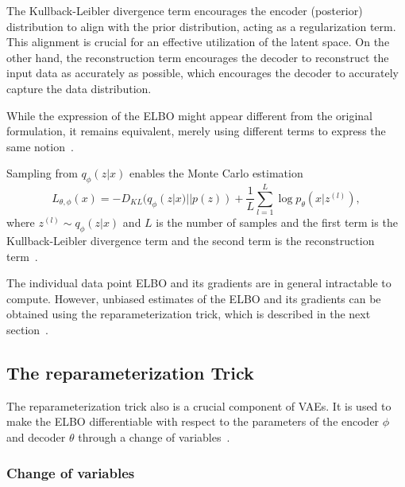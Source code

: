 The Kullback-Leibler divergence term encourages the encoder (posterior) distribution to align with the prior distribution, acting as a regularization term. This alignment is crucial for an effective utilization of the latent space. On the other hand, the reconstruction term encourages the decoder to reconstruct the input data as accurately as possible, which encourages the decoder to accurately capture the data distribution.

While the expression of the ELBO might appear different from the original formulation, it remains equivalent, merely using different terms to express the same notion~\cite{Kingma_2019}.


Sampling from $q_{\phi}(z|x)$ enables the Monte Carlo estimation
\[ L_{\theta, \phi}(x) = - D_{KL}(q_{\phi}(z|x) || p(z)) + \frac{1}{L} \sum_{l=1}^{L} \log p_{\theta}(x|z^{(l)}) ,\]
where $z^{(l)} \sim q_{\phi}(z|x)$ and $L$ is the number of samples and the first term is the Kullback-Leibler divergence term and the second term is the reconstruction term~\cite{Kingma_2019}. 


The individual data point ELBO and its gradients are in general intractable to compute. However, unbiased estimates of the ELBO and its gradients can be obtained using the reparameterization trick, which is described in the next section~\cite{Kingma_2019}.

\subsection{The reparameterization Trick}

The reparameterization trick also is a crucial component of VAEs. It is used to make the ELBO differentiable with respect to the parameters of the encoder $\phi$ and decoder $\theta$ through a change of variables~\cite{Kingma_2019}.

\subsubsection{Change of variables}

